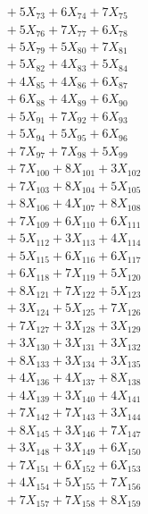 \documentclass[a4paper,10pt]{article}
\begin{document}
{\begin{align}
&\;  + 5 X_{73} + 6 X_{74} + 7 X_{75} \\[0.3ex]
&\;  + 5 X_{76} + 7 X_{77} + 6 X_{78} \\[0.3ex]
&\;  + 5 X_{79} + 5 X_{80} + 7 X_{81} \\[0.3ex]
&\;  + 5 X_{82} + 4 X_{83} + 5 X_{84} \\[0.3ex]
&\;  + 4 X_{85} + 4 X_{86} + 6 X_{87} \\[0.3ex]
&\;  + 6 X_{88} + 4 X_{89} + 6 X_{90} \\[0.3ex]
&\;  + 5 X_{91} + 7 X_{92} + 6 X_{93} \\[0.3ex]
&\;  + 5 X_{94} + 5 X_{95} + 6 X_{96} \\[0.3ex]
&\;  + 7 X_{97} + 7 X_{98} + 5 X_{99} \\[0.5ex]\allowbreak
&\;  + 7 X_{100} + 8 X_{101} + 3 X_{102} \\[0.3ex]
&\;  + 7 X_{103} + 8 X_{104} + 5 X_{105} \\[0.3ex]
&\;  + 8 X_{106} + 4 X_{107} + 8 X_{108} \\[0.3ex]
&\;  + 7 X_{109} + 6 X_{110} + 6 X_{111} \\[0.3ex]
&\;  + 5 X_{112} + 3 X_{113} + 4 X_{114} \\[0.3ex]
&\;  + 5 X_{115} + 6 X_{116} + 6 X_{117} \\[0.3ex]
&\;  + 6 X_{118} + 7 X_{119} + 5 X_{120} \\[0.3ex]
&\;  + 8 X_{121} + 7 X_{122} + 5 X_{123} \\[0.3ex]
&\;  + 3 X_{124} + 5 X_{125} + 7 X_{126} \\[0.3ex]
&\;  + 7 X_{127} + 3 X_{128} + 3 X_{129} \\[0.5ex]\allowbreak
&\;  + 3 X_{130} + 3 X_{131} + 3 X_{132} \\[0.3ex]
&\;  + 8 X_{133} + 3 X_{134} + 3 X_{135} \\[0.3ex]
&\;  + 4 X_{136} + 4 X_{137} + 8 X_{138} \\[0.3ex]
&\;  + 4 X_{139} + 3 X_{140} + 4 X_{141} \\[0.3ex]
&\;  + 7 X_{142} + 7 X_{143} + 3 X_{144} \\[0.3ex]
&\;  + 8 X_{145} + 3 X_{146} + 7 X_{147} \\[0.3ex]
&\;  + 3 X_{148} + 3 X_{149} + 6 X_{150} \\[0.3ex]
&\;  + 7 X_{151} + 6 X_{152} + 6 X_{153} \\[0.3ex]
&\;  + 4 X_{154} + 5 X_{155} + 7 X_{156} \\[0.3ex]
&\;  + 7 X_{157} + 7 X_{158} + 8 X_{159} \\[0.5ex]\allowbreak

\end{align}}
\end{document}
